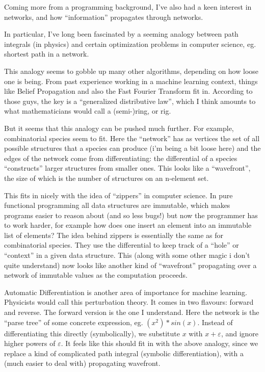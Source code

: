 \documentclass[11pt]{article}
\begin{document}


Coming more from a programming background, I've also had a keen
interest in networks, and how ``information'' propagates through networks.

In particular, I've long been fascinated by a seeming analogy
between path integrals (in physics) and certain optimization problems
in computer science, eg. shortest path in a network.

This analogy seems to gobble up many other algorithms, depending on how
loose one is being. From past experience working in a machine
learning context, things like Belief Propagation and also
the Fast Fourier Transform fit in. According to those guys,
the key is a ``generalized distributive law'', which I think
amounts to what mathematicians would call a (semi-)ring, or rig.

But it seems that this analogy can be pushed much further.
For example, combinatorial species seem to fit. Here the ``network''
has as vertices the set of all possible structures that a species
can produce (i'm being a bit loose here) and the edges of the
network come from differentiating: the differential of
a species ``constructs'' larger structures from smaller ones.
This looks like a ``wavefront'', the size of which is the
number of structures on an n-element set.

This fits in nicely with the idea of ``zippers'' in 
computer science. In pure functional programming all
data structures are immutable, which makes programs easier
to reason about (and so less bugs!) but now the programmer
has to work harder, for example how does one insert an
element into an immutable list of elements? The idea behind
zippers is essentially the same as for combinatorial
species. They use the differential to keep track of a
``hole'' or ``context'' in a given data structure. This 
(along with some other magic i don't quite understand)
now looks like another kind of ``wavefront'' propagating 
over a network of immutable values as the computation proceeds.

Automatic Differentiation is another area of importance
for machine learning. Physicists would
call this perturbation theory. It comes in two
flavours: forward and reverse. The forward version
is the one I understand. Here the network is the
``parse tree'' of some concrete expression, eg. $(x^2)*sin(x)$.
Instead of differentiating this directly (symbolically),
we substitute $x$ with $x+\varepsilon$, and ignore higher powers of $\varepsilon$.
It feels like this should fit in with the above analogy,
since we replace a kind of complicated path integral 
(symbolic differentiation), 
with a (much easier to deal with) propagating wavefront.
\end{document}
